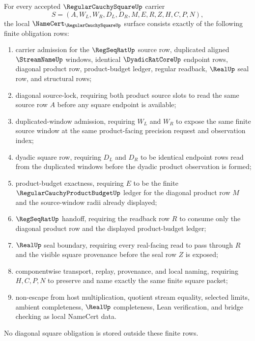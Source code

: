 \begin{theorem}
\label{thm:regular-cauchy-square-namecert-obligations}
For every accepted $\RegularCauchySquareUp$ carrier
$$
S=(A,W_L,W_R,D_L,D_R,M,E,R,Z,H,C,P,N),
$$
the local $\NameCert_{\RegularCauchySquareUp}$ surface consists exactly of the following finite obligation rows:
\begin{enumerate}
\item carrier admission for the $\RegSeqRatUp$ source row, duplicated aligned $\StreamNameUp$ windows, identical $\DyadicRatCoreUp$ endpoint rows, diagonal product row, product-budget ledger, regular readback, $\RealUp$ seal row, and structural rows;
\item diagonal source-lock, requiring both product source slots to read the same source row $A$ before any square endpoint is available;
\item duplicated-window admission, requiring $W_L$ and $W_R$ to expose the same finite source window at the same product-facing precision request and observation index;
\item dyadic square row, requiring $D_L$ and $D_R$ to be identical endpoint rows read from the duplicated windows before the dyadic product observation is formed;
\item product-budget exactness, requiring $E$ to be the finite $\RegularCauchyProductBudgetUp$ ledger for the diagonal product row $M$ and the source-window radii already displayed;
\item $\RegSeqRatUp$ handoff, requiring the readback row $R$ to consume only the diagonal product row and the displayed product-budget ledger;
\item $\RealUp$ seal boundary, requiring every real-facing read to pass through $R$ and the visible square provenance before the seal row $Z$ is exposed;
\item componentwise transport, replay, provenance, and local naming, requiring $H,C,P,N$ to preserve and name exactly the same finite square packet;
\item non-escape from host multiplication, quotient stream equality, selected limits, ambient completeness, $\RealUp$ completeness, Lean verification, and bridge checking as local NameCert data.
\end{enumerate}
No diagonal square obligation is stored outside these finite rows.
\end{theorem}

